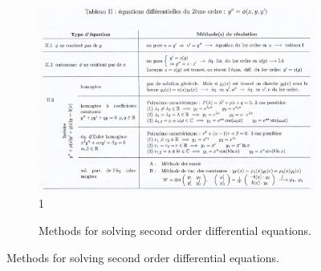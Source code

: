 \documentclass[10pt,a4paper]{article}
\begin{document}
\begin{figure}
\begin{figure}[H]
\centering
\includegraphics[scale=0.7]{EquaDiff_2.PNG}1
\caption{Methods for solving second order differential equations.}
\end{figure}
\end{figure}
\end{document}
